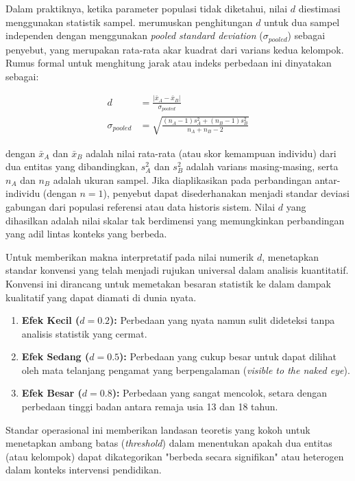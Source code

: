 Dalam praktiknya, ketika parameter populasi tidak diketahui, nilai $d$ diestimasi
menggunakan statistik sampel. \textcite{Cohen1988} merumuskan penghitungan $d$
untuk dua sampel independen dengan menggunakan \textit{pooled standard deviation}
($\sigma_{pooled}$) sebagai penyebut, yang merupakan rata-rata akar kuadrat dari
varians kedua kelompok. Rumus formal untuk menghitung jarak atau indeks perbedaan
ini dinyatakan sebagai:

\begin{align}
    d &= \frac{| \bar{x}_A - \bar{x}_B |}{\sigma_{pooled}} \label{eq:cohen_d_basic} \\
    \sigma_{pooled} &= \sqrt{\frac{(n_A-1)s_A^2 + (n_B-1)s_B^2}{n_A + n_B - 2}} \label{eq:sigma_pooled}
\end{align}

dengan $\bar{x}_A$ dan $\bar{x}_B$ adalah nilai rata-rata (atau skor kemampuan
individu) dari dua entitas yang dibandingkan, $s_A^2$ dan $s_B^2$ adalah varians
masing-masing, serta $n_A$ dan $n_B$ adalah ukuran sampel. Jika diaplikasikan pada
perbandingan antar-individu (dengan $n=1$), penyebut dapat disederhanakan menjadi
standar deviasi gabungan dari populasi referensi atau data historis sistem. Nilai
$d$ yang dihasilkan adalah nilai skalar tak berdimensi yang memungkinkan
perbandingan yang adil lintas konteks yang berbeda.

Untuk memberikan makna interpretatif pada nilai numerik $d$, \textcite{Cohen1988} menetapkan standar konvensi yang telah menjadi rujukan universal dalam analisis kuantitatif. Konvensi ini dirancang untuk memetakan besaran statistik ke dalam dampak kualitatif yang dapat diamati di dunia nyata.
\begin{enumerate}
    \item \textbf{Efek Kecil ($d = 0.2$):} Perbedaan yang nyata namun sulit dideteksi tanpa analisis statistik yang cermat.
    \item \textbf{Efek Sedang ($d = 0.5$):} Perbedaan yang cukup besar untuk dapat dilihat oleh mata telanjang pengamat yang berpengalaman (\textit{visible to the naked eye}).
    \item \textbf{Efek Besar ($d = 0.8$):} Perbedaan yang sangat mencolok, setara dengan perbedaan tinggi badan antara remaja usia 13 dan 18 tahun.
\end{enumerate}
Standar operasional ini memberikan landasan teoretis yang kokoh untuk menetapkan ambang batas (\textit{threshold}) dalam menentukan apakah dua entitas (atau kelompok) dapat dikategorikan "berbeda secara signifikan" atau heterogen dalam konteks intervensi pendidikan.

